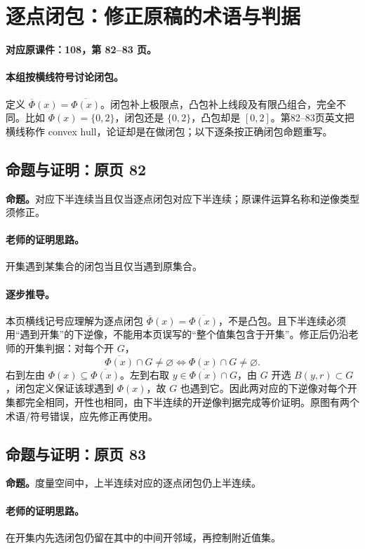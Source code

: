 \clearpage\section{逐点闭包：修正原稿的术语与判据}\label{g:108:82}

\textbf{对应原课件：108，第 82--83 页。}


\paragraph{本组按横线符号讨论闭包。}
定义 $\overline\Phi(x)=\overline{\Phi(x)}$。闭包补上极限点，凸包补上线段及有限凸组合，完全不同。比如 $\Phi(x)=\{0,2\}$，闭包还是 $\{0,2\}$，凸包却是 $[0,2]$。第82--83页英文把横线称作 convex hull，论证却是在做闭包；以下逐条按正确闭包命题重写。


\subsection{命题与证明：原页 82}

\textbf{命题。}对应下半连续当且仅当逐点闭包对应下半连续；原课件运算名称和逆像类型须修正。

\paragraph{老师的证明思路。}开集遇到某集合的闭包当且仅当遇到原集合。

\paragraph{逐步推导。}本页横线记号应理解为逐点闭包 $\overline\Phi(x)=\overline{\Phi(x)}$，不是凸包。且下半连续必须用“遇到开集”的下逆像，不能用本页误写的“整个值集包含于开集”。修正后仍沿老师的开集判据：对每个开 $G$，
\[\overline{\Phi(x)}\cap G\ne\varnothing\iff\Phi(x)\cap G\ne\varnothing.\]
右到左由 $\Phi(x)\subseteq\overline{\Phi(x)}$。左到右取 $y\in\overline{\Phi(x)}\cap G$，由 $G$ 开选 $B(y,r)\subset G$，闭包定义保证该球遇到 $\Phi(x)$，故 $G$ 也遇到它。因此两对应的下逆像对每个开集都完全相同，开性也相同，由下半连续的开逆像判据完成等价证明。原图有两个术语/符号错误，应先修正再使用。

\subsection{命题与证明：原页 83}

\textbf{命题。}度量空间中，上半连续对应的逐点闭包仍上半连续。

\paragraph{老师的证明思路。}在开集内先选闭包仍留在其中的中间开邻域，再控制附近值集。

